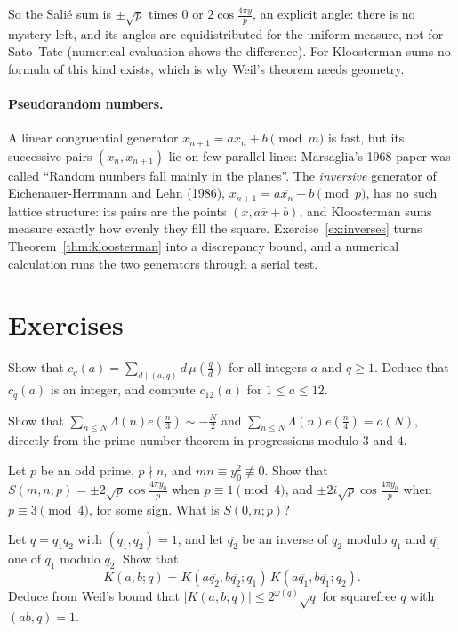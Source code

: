 So the Salié sum is $\pm\sqrt p$ times $0$ or $2\cos\frac{4\pi y}p$, an explicit angle: there is no mystery left, and its angles are equidistributed for the uniform measure, not for Sato--Tate (numerical evaluation shows the difference). For Kloosterman sums no formula of this kind exists, which is why Weil's theorem needs geometry.

\paragraph{Pseudorandom numbers.} A linear congruential generator $x_{n+1}=ax_n+b\pmod m$ is fast, but its successive pairs $(x_n,x_{n+1})$ lie on few parallel lines: Marsaglia's 1968 paper was called ``Random numbers fall mainly in the planes''. The \emph{inversive} generator of Eichenauer-Herrmann and Lehn (1986), $x_{n+1}=a\overline{x_n}+b\pmod p$, has no such lattice structure: its pairs are the points $(x,a\overline x+b)$, and Kloosterman sums measure exactly how evenly they fill the square. Exercise~\ref{ex:inverses} turns Theorem~\ref{thm:kloosterman} into a discrepancy bound, and a numerical calculation runs the two generators through a serial test.

\section{Exercises}

\begin{exercise}[$\star$]\label{ex:ramanujan}
Show that $c_q(a)=\sum_{d\mid(a,q)}d\,\mu(\frac qd)$ for all integers $a$ and $q\ge1$. Deduce that $c_q(a)$ is an integer, and compute $c_{12}(a)$ for $1\le a\le12$.
\end{exercise}

\begin{exercise}[$\star$]\label{ex:sthird}
Show that $\sum_{n\le N}\Lambda(n)e(\frac n3)\sim-\frac N2$ and $\sum_{n\le N}\Lambda(n)e(\frac n4)=o(N)$, directly from the prime number theorem in progressions modulo $3$ and $4$.
\end{exercise}

\begin{exercise}[$\star$]\label{ex:salie}
Let $p$ be an odd prime, $p\nmid n$, and $mn\equiv y_0^2\not\equiv0$. Show that $S(m,n;p)=\pm2\sqrt p\cos\frac{4\pi y_0}p$ when $p\equiv1\pmod4$, and $\pm2i\sqrt p\cos\frac{4\pi y_0}p$ when $p\equiv3\pmod4$, for some sign. What is $S(0,n;p)$?
\end{exercise}

\begin{exercise}[$\star\star$]\label{ex:twisted}
Let $q=q_1q_2$ with $(q_1,q_2)=1$, and let $\overline{q_2}$ be an inverse of $q_2$ modulo $q_1$ and $\overline{q_1}$ one of $q_1$ modulo $q_2$. Show that
\[
K(a,b;q)=K(a\overline{q_2},b\overline{q_2};q_1)\,K(a\overline{q_1},b\overline{q_1};q_2).
\]
Deduce from Weil's bound that $|K(a,b;q)|\le2^{\omega(q)}\sqrt q$ for squarefree $q$ with $(ab,q)=1$.
\end{exercise}

